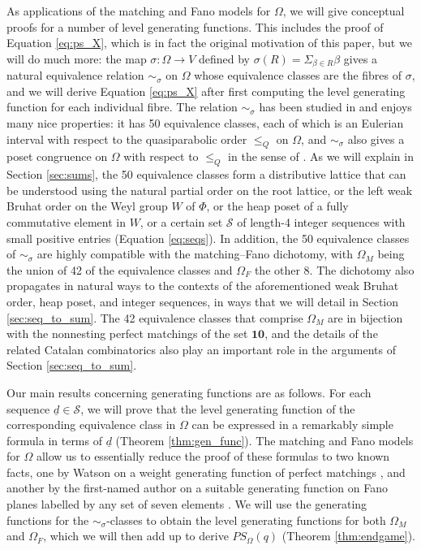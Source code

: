 \documentclass[11pt]{amsart}
\theoremstyle{plain}
\theoremstyle{definition}
\theoremstyle{remark}
\numberwithin{equation}{section}
\newcommand{\be}{\beta}
\newcommand{\ra}{\rightarrow}
\newcommand{\seqd}{\underline{d}}
\newcommand{\cals}{\mathcal{S}}
\newcommand{\ten}{\mathbf{10}}
\newcommand{\ob}{\Omega}
\newcommand{\mob}{\Omega_M}
\begin{document}
As applications of the matching and Fano models for $\ob$, we will give
conceptual proofs for a number of level generating functions. This includes the
proof of Equation \eqref{eq:ps_X}, which is in fact the original motivation of
this paper, but we will do much more: the map $\sigma : \ob \ra V$ defined by
$\sigma(R) = \Sigma_{\be \in R} \be$ gives a natural equivalence relation
$\sim_\sigma$ on $\ob$ whose equivalence classes are the fibres of $\sigma$, and
we will derive Equation \eqref{eq:ps_X} after first computing the level
generating function for each individual fibre. The relation $\sim_\sigma$ has
been studied in \cite[Section 5.5]{gx5} and enjoys many nice properties: it has
50 equivalence classes, each of which is an Eulerian interval with respect to
the quasiparabolic order $\le_Q$ on $\ob$, and $\sim_\sigma$ also gives
a poset congruence on $\ob$ with respect to $\le_Q$ in the sense of
\cite{reading02}. As we will explain in Section \ref{sec:sums}, the 50
equivalence classes form a distributive lattice that can be understood using
the natural partial order on the root lattice, or the left weak Bruhat order on
the Weyl group $W$ of $\Phi$, or the heap poset of a fully commutative element
in $W$, or a certain set $\cals$ of length-4 integer sequences with small
positive entries (Equation \eqref{eq:seqs}). In addition, the 50 equivalence
classes of $\sim_\sigma$ are highly compatible with the matching--Fano
dichotomy, with $\ob_M$ being the union of 42 of the equivalence classes and
$\ob_F$ the other 8. The dichotomy also propagates in natural ways to the
contexts of the aforementioned weak Bruhat order, heap poset, and integer
sequences, in ways that we will detail in Section \ref{sec:seq_to_sum}. The 42
equivalence classes that comprise $\mob$ are in bijection with the nonnesting
perfect matchings of the set $\ten$, and the details of the related Catalan
combinatorics also play an important role in the arguments of Section
\ref{sec:seq_to_sum}.

Our main results concerning generating functions are as follows. For each
sequence $\seqd\in \cals$, we will prove that the level generating function of the
corresponding equivalence class in $\ob$ can be expressed in a remarkably simple
formula in terms of $\seqd$ (Theorem \ref{thm:gen_func}). The matching and Fano
models for $\ob$ allow us to essentially reduce the proof of these formulas to
two known facts, one by Watson on a weight generating function of perfect
matchings \cite{watson14}, and another by the first-named author on a suitable
generating function on Fano planes labelled by any set of seven elements
\cite{the240}. We will use the generating functions for the
$\sim_\sigma$-classes to obtain the level generating functions for both $\ob_M$
and $\ob_F$, which we will then add up
to derive $PS_{\ob}(q)$ (Theorem \ref{thm:endgame}).
\end{document}
